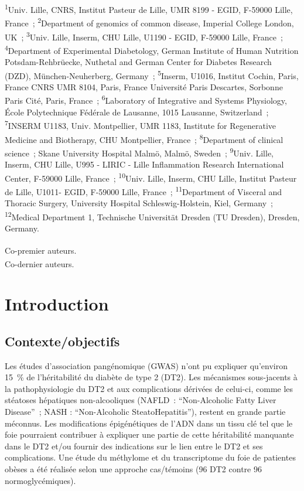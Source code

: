 \documentclass[11pt,a4paper,notrimn]{krantz}
\theoremstyle{definition}
\theoremstyle{definition}
\theoremstyle{remark}
\begin{document}
\footnotesize
\textsuperscript{1}Univ. Lille, CNRS, Institut Pasteur de Lille, UMR
8199 - EGID, F-59000 Lille, France~; \textsuperscript{2}Department of
genomics of common disease, Imperial College London, UK~;
\textsuperscript{3}Univ. Lille, Inserm, CHU Lille, U1190 - EGID, F-59000
Lille, France~; \textsuperscript{4}Department of Experimental
Diabetology, German Institute of Human Nutrition Potsdam-Rehbrüecke,
Nuthetal and German Center for Diabetes Research (DZD),
München-Neuherberg, Germany~; \textsuperscript{5}Inserm, U1016, Institut
Cochin, Paris, France CNRS UMR 8104, Paris, France Université Paris
Descartes, Sorbonne Paris Cité, Paris, France~;
\textsuperscript{6}Laboratory of Integrative and Systems Physiology,
École Polytechnique Fédérale de Lausanne, 1015 Lausanne, Switzerland~;
\textsuperscript{7}INSERM U1183, Univ. Montpellier, UMR 1183, Institute
for Regenerative Medicine and Biotherapy, CHU Montpellier, France~;
\textsuperscript{8}Department of clinical science~; Skane University
Hospital Malmö, Malmö, Sweden~; \textsuperscript{9}Univ. Lille, Inserm,
CHU Lille, U995 - LIRIC - Lille Inflammation Research International
Center, F-59000 Lille, France~; \textsuperscript{10}Univ. Lille, Inserm,
CHU Lille, Institut Pasteur de Lille, U1011- EGID, F-59000 Lille,
France~; \textsuperscript{11}Department of Visceral and Thoracic
Surgery, University Hospital Schleswig-Holstein, Kiel, Germany~;
\textsuperscript{12}Medical Department 1, Technische Universität Dresden
(TU Dresden), Dresden, Germany.

\textsuperscript{\textasteriskcentered}Co-premier auteurs.\\
\textsuperscript{\textdagger}Co-dernier auteurs. \normalsize

\clearpage

\section{Introduction}\label{introduction-3}

\subsection{Contexte/objectifs}\label{contexteobjectifs-2}

Les études d'association pangénomique (GWAS) n'ont pu expliquer
qu'environ 15~\% de l'héritabilité du diabète de type 2 (DT2). Les
mécanismes sous-jacents à la pathophysiologie du DT2 et aux
complications dérivées de celui-ci, comme les stéatoses hépatiques
non-alcooliques (NAFLD~: ``Non-Alcoholic Fatty Liver Disease''~; NASH :
``Non-Alcoholic SteatoHepatitis''), restent en grande partie méconnus.
Les modifications épigénétiques de l'ADN dans un tissu clé tel que le
foie pourraient contribuer à expliquer une partie de cette héritabilité
manquante dans le DT2 et/ou fournir des indications sur le lien entre le
DT2 et ses complications. Une étude du méthylome et du transcriptome du
foie de patientes obèses a été réalisée selon une approche cas/témoins
(96 DT2 contre 96 normoglycémiques).
\end{document}
